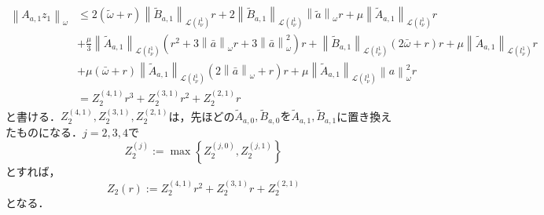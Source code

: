 \documentclass[11pt,a4paper,titlepage]{jsreport}
\theoremstyle{definition}
\newtheorem{thm}{定理}
\begin{document}
\begin{equation*}
  \begin{split}
    \left\| A_{a,1} z_1 \right\|_{\omega} &\leq 2\left(\tilde{\omega} + r\right) \left\| \tilde{B}_{a,1} \right\|_{\mathcal{L}\left(l_{\nu}^1\right)} r + 2 \left\| \tilde{B}_{a,1} \right\|_{\mathcal{L}\left(l_{\nu}^1\right)} \left\| \tilde{a} \right\|_\omega r + \mu \left\| \tilde{A}_{a,1} \right\|_{\mathcal{L}\left(l_{\nu}^1\right)} r \\
    &+ \frac{\mu}{3} \left\| \tilde{A}_{a,1} \right\|_{\mathcal{L}\left(l_{\nu}^1\right)} \left( r^2 + 3 \left\| \bar{a} \right\|_\omega r + 3 \left\| \bar{a} \right\|^2_\omega \right) r + \left\| \tilde{B}_{a,1} \right\|_{\mathcal{L}\left(l_{\nu}^1\right)} \left( 2\bar{\omega} + r\right)r + \mu \left\| \tilde{A}_{a,1} \right\|_{\mathcal{L}\left(l_{\nu}^1\right)} r \\
    &+ \mu\left(\bar{\omega}+r\right)\left\| \tilde{A}_{a,1} \right\|_{\mathcal{L}\left(l_{\nu}^1\right)} \left( 2 \left\| \bar{a} \right\|_{\omega} + r\right)r + \mu \left\| \tilde{A}_{a,1} \right\|_{\mathcal{L}\left(l_{\nu}^1\right)} \left\| a \right\|_\omega^2 r\\
    &= Z_2^{(4,1)} r^3 + Z_2^{(3,1)} r^2 + Z_2^{(2,1)} r
  \end{split}
\end{equation*}
と書ける．$Z_2^{(4,1)},Z_2^{(3,1)},Z_2^{(2,1)}$は，先ほどの$\tilde{A}_{a,0},\tilde{B}_{a,0}を\tilde{A}_{a,1},\tilde{B}_{a,1}$に置き換えたものになる．$j=2,3,4$で
\begin{equation*}
  Z_2^{(j)} := \max \left\{ Z_2^{(j,0)}, Z_2^{(j,1)} \right\}
\end{equation*}
とすれば，
\begin{equation*}
  Z_2(r) := Z_2^{(4,1)} r^2 + Z_2^{(3,1)} r + Z_2^{(2,1)}
\end{equation*}
となる．

\end{document}
